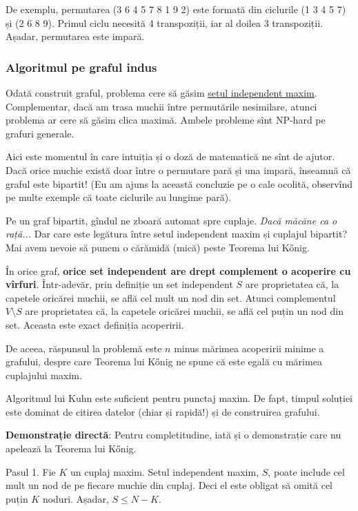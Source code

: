 \documentclass[../main.tex]{subfiles}
\begin{document}
De exemplu, permutarea (3 6 4 5 7 8 1 9 2) este formată din ciclurile (1 3 4 5 7) și (2 6 8 9). Primul ciclu necesită 4 transpoziții, iar al doilea 3 transpoziții. Așadar, permutarea este impară.

\subsubsection*{Algoritmul pe graful indus}

Odată construit graful, problema cere să găsim \href{https://en.wikipedia.org/wiki/Independent_set_(graph_theory)}{setul independent maxim}. Complementar, dacă am trasa muchii între permutările nesimilare, atunci problema ar cere să găsim clica maximă. Ambele probleme sînt NP-hard pe grafuri generale.

Aici este momentul în care intuiția și o doză de matematică ne sînt de ajutor. Dacă orice muchie există doar între o permutare pară și una impară, înseamnă că graful este bipartit! (Eu am ajuns la această concluzie pe o cale ocolită, observînd pe multe exemple că toate ciclurile au lungime pară).

Pe un graf bipartit, gîndul ne zboară automat spre cuplaje. \textit{Dacă măcăne ca o rață...} Dar care este legătura între setul independent maxim și cuplajul bipartit? Mai avem nevoie să punem o cărămidă (mică) peste Teorema lui Kőnig.

În orice graf, \textbf{orice set independent are drept complement o acoperire cu vîrfuri}. Într-adevăr, prin definiție un set independent $S$ are proprietatea că, la capetele oricărei muchii, se află cel mult un nod din set. Atunci complementul $V \setminus S$ are proprietatea că, la capetele oricărei muchii, se află cel puțin un nod din set. Aceasta este exact definiția acoperirii.

De aceea, răspunsul la problemă este $n$ minus mărimea acoperirii minime a grafului, despre care Teorema lui Kőnig ne spune că este egală cu mărimea cuplajului maxim.

Algoritmul lui Kuhn este suficient pentru punctaj maxim. De fapt, timpul soluției este dominat de citirea datelor (chiar și rapidă!) și de construirea grafului.

\textbf{Demonstrație directă}: Pentru completitudine, iată și o demonstrație care nu apelează la Teorema lui Kőnig.

Pasul 1. Fie $K$ un cuplaj maxim. Setul independent maxim, $S$, poate include cel mult un nod de pe fiecare muchie din cuplaj. Deci el este obligat să omită cel puțin $K$ noduri. Așadar, $S \leq N - K$.
\end{document}
